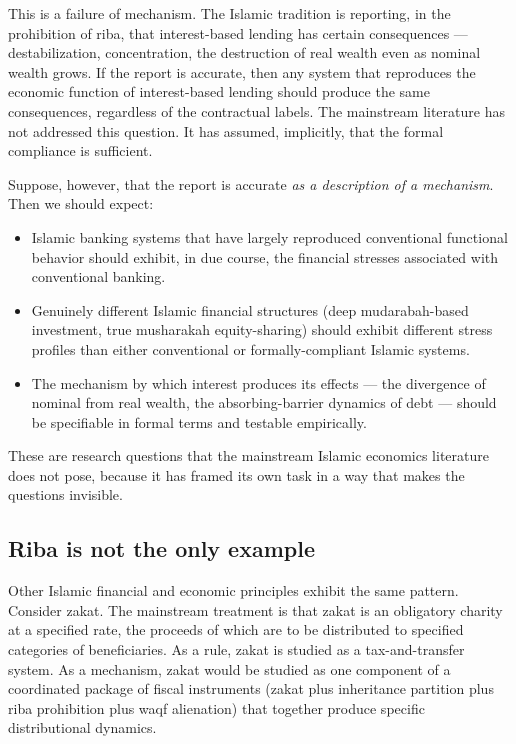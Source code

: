 This is a failure of mechanism. The Islamic tradition is reporting,
in the prohibition of riba, that interest-based lending has certain
consequences --- destabilization, concentration, the destruction of
real wealth even as nominal wealth grows. If the report is accurate,
then any system that reproduces the economic function of
interest-based lending should produce the same consequences,
regardless of the contractual labels. The mainstream literature has
not addressed this question. It has assumed, implicitly, that the
formal compliance is sufficient.

Suppose, however, that the report is accurate \emph{as a description
of a mechanism}. Then we should expect:

\begin{itemize}[leftmargin=2em]
    \item Islamic banking systems that have largely reproduced
    conventional functional behavior should exhibit, in due course,
    the financial stresses associated with conventional banking.
    \item Genuinely different Islamic financial structures (deep
    mudarabah-based investment, true musharakah equity-sharing)
    should exhibit different stress profiles than either
    conventional or formally-compliant Islamic systems.
    \item The mechanism by which interest produces its effects ---
    the divergence of nominal from real wealth, the absorbing-barrier
    dynamics of debt --- should be specifiable in formal terms and
    testable empirically.
\end{itemize}

These are research questions that the mainstream Islamic economics
literature does not pose, because it has framed its own task in a
way that makes the questions invisible.

\subsection{Riba is not the only example}

Other Islamic financial and economic principles exhibit the same
pattern. Consider zakat. The mainstream treatment is that zakat is
an obligatory charity at a specified rate, the proceeds of which are
to be distributed to specified categories of beneficiaries. As a
rule, zakat is studied as a tax-and-transfer system. As a mechanism,
zakat would be studied as one component of a coordinated package of
fiscal instruments (zakat plus inheritance partition plus riba
prohibition plus waqf alienation) that together produce specific
distributional dynamics.

